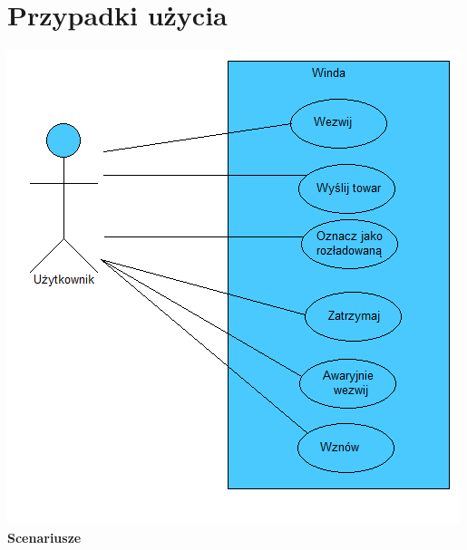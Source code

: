 \documentclass[a4paper,11pt]{article}
\begin{document}
\section{Przypadki użycia}
	\includegraphics{images/useCase.png}    	
	\textbf{Scenariusze} \\
\end{document}
